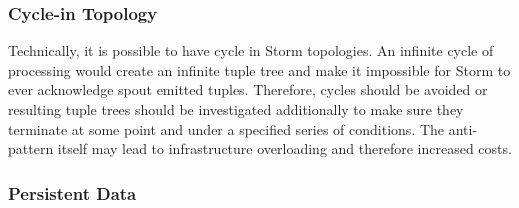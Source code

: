 \begin{figure}
\centering 
{}\label{fig:multi-anchoring}
\hspace{1cm}
\label{fig:cycle}
\end{figure}


\subsubsection{Cycle-in Topology}

Technically, it is possible to have cycle in Storm topologies. An infinite cycle of processing would create an infinite tuple tree and make it impossible for Storm to ever acknowledge spout emitted tuples. Therefore, cycles should be avoided or resulting tuple trees should be investigated additionally to make sure they terminate at some point and under a specified series of conditions. The anti-pattern itself may lead to infrastructure overloading and therefore increased costs.


\subsubsection{Persistent Data}

